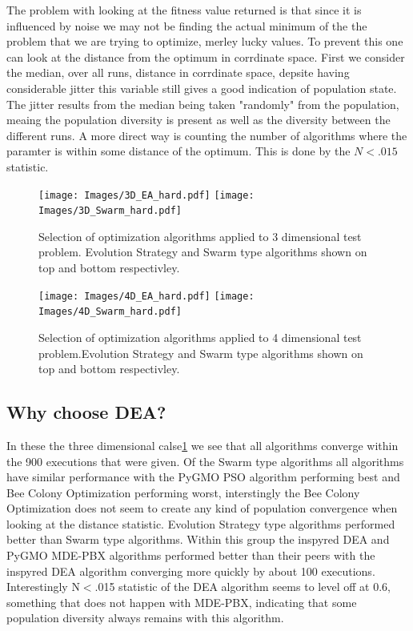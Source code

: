 \documentclass[a4paper,titlepage]{report}
\begin{document}
The problem with looking at the fitness value returned is that since it is influenced by noise we may not be finding the actual minimum of the the problem that we are trying to optimize, merley lucky values. To prevent this one can look at the distance from the optimum in corrdinate space. First we consider the median, over all runs, distance in corrdinate space, depsite having considerable jitter this variable still gives a good indication of population state. The jitter results from the median being taken "randomly" from the population, meaing the population diversity is present as well as the diversity between the different runs. A  more direct way is counting the number of algorithms where the paramter is within some distance of the optimum. This is done by the $N<.015$ statistic.

\begin{figure}[htb]
\centering
\texttt{[image: Images/3D\_EA\_hard.pdf]}
\vspace{0.5cm}
\texttt{[image: Images/3D\_Swarm\_hard.pdf]}
\caption{Selection of optimization algorithms applied to 3 dimensional test problem. Evolution Strategy and Swarm type algorithms shown on top and bottom respectivley.}
\label{fig: 3d_hard}
\end{figure}

\begin{figure}[htb]
\centering
\texttt{[image: Images/4D\_EA\_hard.pdf]}
\vspace{0.5cm}
\texttt{[image: Images/4D\_Swarm\_hard.pdf]}
\caption{Selection of optimization algorithms applied to 4 dimensional test problem.Evolution Strategy and Swarm type algorithms shown on top and bottom respectivley.}
\label{fig: 4d_hard}
\end{figure}

\subsection{Why choose DEA?}
In these the three dimensional calse\ref{fig: 3d_hard} we see that all algorithms converge within the 900 executions that were given. Of the Swarm type algorithms all algorithms have similar performance with the PyGMO PSO algorithm performing best and Bee Colony Optimization performing worst, interstingly the Bee Colony Optimization does not seem to create any kind of population convergence when looking at the distance statistic. Evolution Strategy type algorithms performed better than Swarm type algorithms. Within this group the inspyred DEA and PyGMO MDE-PBX algorithms performed better than their peers with the inspyred DEA algorithm converging more quickly by about 100 executions. Interestingly N$<$.015 statistic of the DEA algorithm seems to level off at 0.6, something that does not happen with MDE-PBX, indicating that some population diversity always remains with this algorithm.
\end{document}
